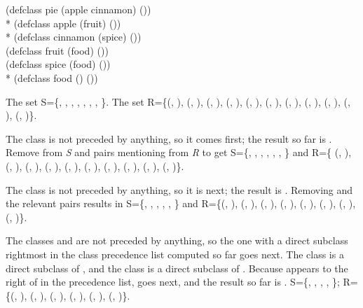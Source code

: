 \begin{lisp}
(defclass pie (apple cinnamon) ()) \\*
(defclass apple (fruit) ()) \\*
(defclass cinnamon (spice) ()) \\
(defclass fruit (food) ()) \\
(defclass spice (food) ()) \\*
(defclass food () ())
\end{lisp}

\begin{flushleft}

The set
S=\{,
,
,
,
,
,
,
\}.
The set R=\{(,
),
(,
),
(,
),
(,
),
(,
),
(,
),
(,
),
(,
),
(,
),
(,
),
(,
)\}.

The class  is not preceded by anything, so it comes first;
the result so far is .  Remove  from \emph{S} and pairs
mentioning  from \emph{R} to get
S=\{,
,
,
,
,
,
\} and R=\{
(,
),
(,
),
(,
),
(,
),
(,
),
(,
),
(,
),
(,
),
(,
),
(,
)\}.

The class  is not preceded by anything, so it is next; the
result is . Removing  and the relevant
pairs results in S=\{,
,
,
,
,
\} and R=\{(,
),
(,
),
(,
),
(,
),
(,
),
(,
),
(,
),
(,
)\}.

The classes  and  are not preceded by
anything, so the one with a direct subclass rightmost in the class
precedence list computed so far goes next.  The class  is a
direct subclass of , and the class  is a direct
subclass of .  Because  appears to the right
of  in the precedence list,  goes next, and the
result so far is .  S=\{,
,
,
,
\}; R=\{(,
),
(,
),
(,
),
(,
),
(,
),
(,
)\}.


\end{flushleft}
